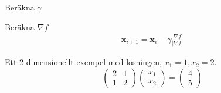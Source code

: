 \documentclass{article}
\begin{document}
    Beräkna $\gamma $

    Beräkna $\nabla f$
\begin{gather*}
        \mathbf{x}_{i+1} = \mathbf{x}_i - \gamma \frac{\nabla f}{\left\lvert \nabla f\right\rvert } 
\end{gather*}


\newpage
Ett 2-dimensionellt exempel med lösningen, $x_1 = 1, x_2 = 2$.
\begin{equation*}
\left(
    \begin{matrix}
        2 & 1 \\
        1 & 2
    \end{matrix}
    \right) 
\left(
    \begin{matrix}
        x_1 \\
        x_2
    \end{matrix}
\right) = 
\left(
    \begin{matrix}
        4 \\
        5
    \end{matrix}
\right)
\end{equation*}
\end{document}
